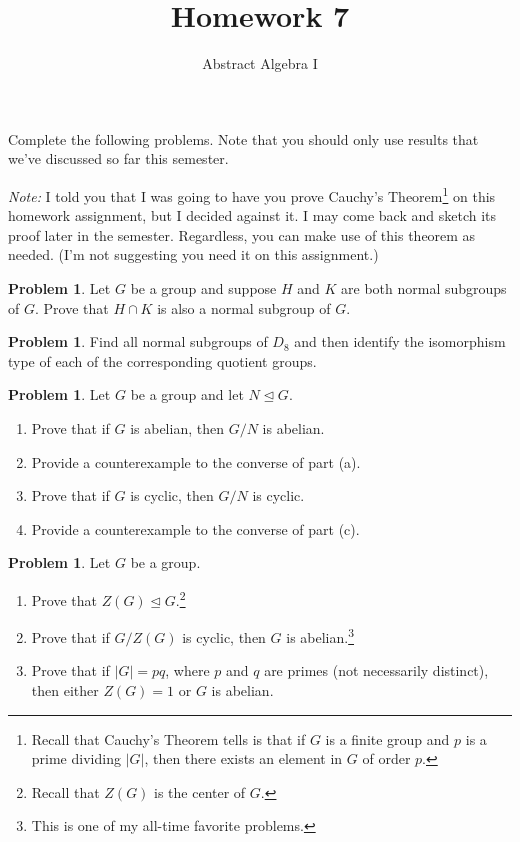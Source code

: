 \documentclass[11pt]{scrartcl}
\theoremstyle{definition}
\newtheorem{problem}[theorem]{Problem}
\newcommand{\blankline}{\pagebreak[2]\vspace{.5\baselineskip}}
\begin{document}
\title{Homework 7}
\subtitle{Abstract Algebra I}
\date{}

\maketitle
\thispagestyle{fancy}

Complete the following problems. Note that you should only use results that we've discussed so far this semester.

\blankline

\emph{Note:} I told you that I was going to have you prove Cauchy's Theorem\footnote{Recall that Cauchy's Theorem tells is that if $G$ is a finite group and $p$ is a prime dividing $|G|$, then there exists an element in $G$ of order $p$.} on this homework assignment, but I decided against it.  I may come back and sketch its proof later in the semester.  Regardless, you can make use of this theorem as needed. (I'm not suggesting you need it on this assignment.)

\begin{problem}
Let $G$ be a group and suppose $H$ and $K$ are both normal subgroups of $G$.  Prove that $H\cap K$ is also a normal subgroup of $G$.
\end{problem}

\begin{problem}
Find all normal subgroups of $D_8$ and then identify the isomorphism type of each of the corresponding quotient groups.
\end{problem}

\begin{problem}
Let $G$ be a group and let $N\unlhd G$. 
\begin{enumerate}[label=\rm{(\alph*)}]
\item Prove that if $G$ is abelian, then $G/N$ is abelian.
\item Provide a counterexample to the converse of part (a).
\item Prove that if $G$ is cyclic, then $G/N$ is cyclic.
\item Provide a counterexample to the converse of part (c).
\end{enumerate}
\end{problem}

\begin{problem}
Let $G$ be a group.
\begin{enumerate}[label=\rm{(\alph*)}]
\item Prove that $Z(G)\unlhd G$.\footnote{Recall that $Z(G)$ is the center of $G$.}
\item Prove that if $G/Z(G)$ is cyclic, then $G$ is abelian.\footnote{This is one of my all-time favorite problems.}
\item Prove that if $|G|=pq$, where $p$ and $q$ are primes (not necessarily distinct), then either $Z(G)=1$ or $G$ is abelian.
\end{enumerate}
\end{problem}
\end{document}
